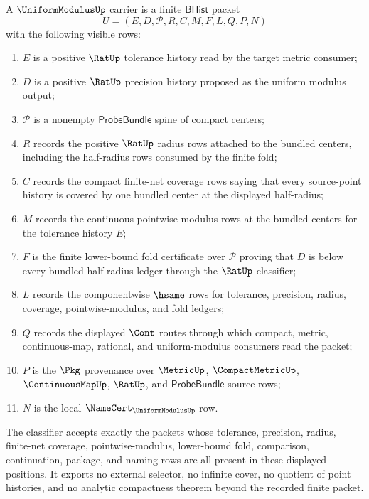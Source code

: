 \begin{definition}
\label{def:uniformmodulus-bhist-carrier}
A $\UniformModulusUp$ carrier is a finite $\mathsf{BHist}$ packet
$$
U=(E,D,\mathcal{P},R,C,M,F,L,Q,P,N)
$$
with the following visible rows:
\begin{enumerate}
\item $E$ is a positive $\RatUp$ tolerance history read by the target metric consumer;
\item $D$ is a positive $\RatUp$ precision history proposed as the uniform modulus output;
\item $\mathcal{P}$ is a nonempty $\mathsf{ProbeBundle}$ spine of compact centers;
\item $R$ records the positive $\RatUp$ radius rows attached to the bundled centers, including the half-radius rows consumed by the finite fold;
\item $C$ records the compact finite-net coverage rows saying that every source-point history is covered by one bundled center at the displayed half-radius;
\item $M$ records the continuous pointwise-modulus rows at the bundled centers for the tolerance history $E$;
\item $F$ is the finite lower-bound fold certificate over $\mathcal{P}$ proving that $D$ is below every bundled half-radius ledger through the $\RatUp$ classifier;
\item $L$ records the componentwise $\hsame$ rows for tolerance, precision, radius, coverage, pointwise-modulus, and fold ledgers;
\item $Q$ records the displayed $\Cont$ routes through which compact, metric, continuous-map, rational, and uniform-modulus consumers read the packet;
\item $P$ is the $\Pkg$ provenance over $\MetricUp$, $\CompactMetricUp$, $\ContinuousMapUp$, $\RatUp$, and $\mathsf{ProbeBundle}$ source rows;
\item $N$ is the local $\NameCert_{\UniformModulusUp}$ row.
\end{enumerate}
The classifier accepts exactly the packets whose tolerance, precision, radius, finite-net coverage, pointwise-modulus, lower-bound fold, comparison, continuation, package, and naming rows are all present in these displayed positions. It exports no external selector, no infinite cover, no quotient of point histories, and no analytic compactness theorem beyond the recorded finite packet.
\end{definition}

